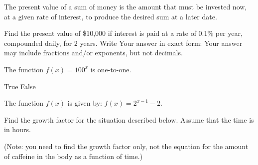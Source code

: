 \documentclass[11pt,answers]{exam}
\begin{document}
\begin{questions}


\addpoints



\question[2] The present value of a sum of money is the amount that must be invested now, at a given rate of interest, to produce the desired sum at a later date. 

Find the present value of \$10,000 if interest is paid at a rate of 0.1\% per year, compounded daily, for 2 years. Write Your answer in exact form: Your answer may include fractions and/or exponents, but not decimals.

\fillwithdottedlines{2cm}
\bonusquestion[1]  The function $\displaystyle f(x)=100^x$ is one-to-one.
\begin{oneparchoices}
	\choice True
	\choice False
\end{oneparchoices}

\question The function $f(x)$ is given by: $\displaystyle f(x) = 2^{x-1}-2$. 

\question[1]  Find the growth factor for the situation described below. Assume that the time is in hours.

{}

(Note: you need to find the growth factor only, not the equation for the amount of caffeine in the body as a function of time.)

		\fillwithdottedlines{2cm}
\end{questions}
\end{document}
